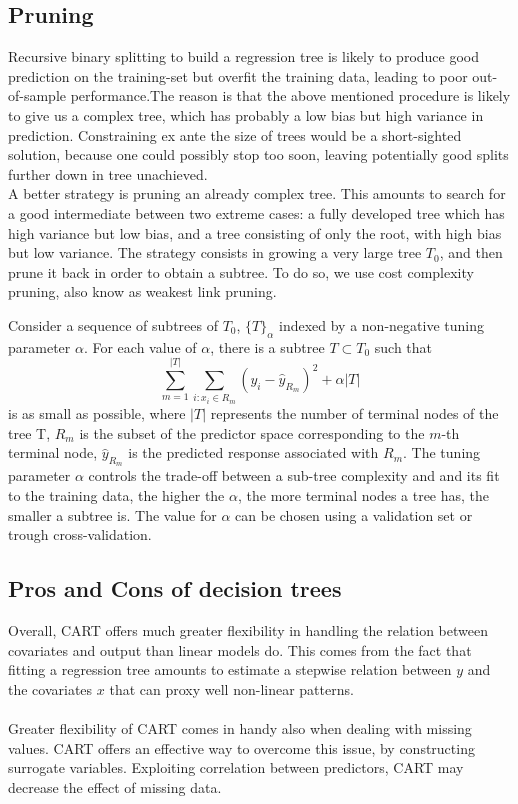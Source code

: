 \documentclass[a4paper,11pt]{article}
\begin{document}
\subsection{Pruning}

Recursive binary splitting to build a regression tree  is likely to produce good prediction on the training-set but overfit the training data, leading to poor out-of-sample performance.The reason is that the above mentioned procedure is likely to give us a complex tree, which has probably a low bias but high variance in prediction. Constraining ex ante the size of trees would be a short-sighted solution, because one could possibly stop too soon, leaving potentially good splits further down in tree unachieved.
\\A better strategy is pruning an already complex tree. This amounts to search for a good intermediate between two extreme cases: a fully developed tree which has high variance but low bias, and a tree consisting of only the root, with high bias but low variance. 
The strategy consists in growing a very large tree $T_0$, and then prune it back in order to obtain a subtree. To do so, we use cost complexity pruning, also know as weakest link pruning.

Consider a sequence of subtrees of $T_0$, $\{T\}_\alpha$ indexed by a non-negative tuning parameter $\alpha$.
For each value of $\alpha$, there is a subtree $T \subset T_0$ such that
$$\sum_{m=1}^{|T|} \sum_{i : x_i \in R_m} \left( y_i - \hat{y}_{R_m} \right)^2 + \alpha |T|$$
is as small as possible, where $|T|$ represents the number of terminal nodes of the tree T, $R_m$ is the subset of the predictor space corresponding to the $m$-th terminal node, $\hat{y}_{R_m}$ is the predicted response associated with $R_m$.
The tuning parameter $\alpha$ controls the trade-off between a sub-tree complexity and and its fit to the training data, the higher the $\alpha$, the more terminal nodes a tree has, the smaller a subtree is.
The value for $\alpha$ can be chosen using a validation set or trough cross-validation.

\subsection{Pros and Cons of decision trees}
Overall, CART offers much greater flexibility in handling the relation between covariates and output than linear models do. This comes from the fact that fitting a regression tree amounts to estimate a stepwise relation between $y$ and the covariates $x$ that can proxy well non-linear patterns. 
\\\\Greater flexibility of CART comes in handy also when dealing with missing values. CART offers an effective way to overcome this issue, by constructing surrogate variables. Exploiting correlation between predictors, CART may decrease the effect of missing data. 
\end{document}
